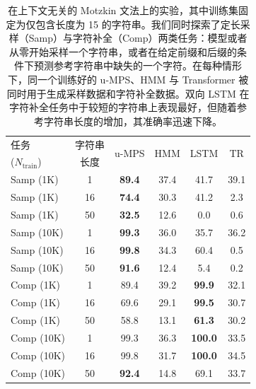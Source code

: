 \begin{table}[t]
\caption{在上下文无关的 Motzkin 文法上的实验，其中训练集固定为仅包含长度为 15 的字符串。我们同时探索了定长采样（Samp）与字符补全（Comp）两类任务：模型或者从零开始采样一个字符串，或者在给定前缀和后缀的条件下预测参考字符串中缺失的一个字符。在每种情形下，同一个训练好的 u-MPS、HMM 与 Transformer 被同时用于生成采样数据和字符补全数据。双向 LSTM 在字符补全任务中于较短的字符串上表现最好，但随着参考字符串长度的增加，其准确率迅速下降。}
\label{tab:motzkin}
\setlength\aboverulesep{0.1pt}
\setlength\belowrulesep{0.1pt}
\renewcommand{\arraystretch}{1.1}
\begin{center}
\begin{small}
\begin{sc}
\begin{tabular}{lc|cccc}
    任务 & 字符串 & \multirow{2}{*}{u-MPS} & \multirow{2}{*}{HMM} & \multirow{2}{*}{LSTM} & \multirow{2}{*}{TR} \\
    ($N_{\mathrm{train}}$) & 长度 &      &  &  &  \\
    \midrule
    Samp (1K)  & 1  & \textbf{89.4} & 37.4 & 41.7           & 39.1 \\
    Samp (1K)  & 16 & \textbf{74.4} & 30.3 & 41.2           & 2.3  \\
    Samp (1K)  & 50 & \textbf{32.5} & 12.6 & 0.0            & 0.6  \\
    Samp (10K) & 1  & \textbf{99.3} & 36.0 & 35.7           & 36.2 \\
    Samp (10K) & 16 & \textbf{99.8} & 34.3 & 60.4           & 0.5  \\
    Samp (10K) & 50 & \textbf{91.6} & 12.4 & 5.4            & 0.2  \\
    Comp (1K)  & 1  & 89.4          & 39.2 & \textbf{99.9}  & 32.1 \\
    Comp (1K)  & 16 & 69.6          & 29.1 & \textbf{99.5}  & 30.7 \\
    Comp (1K)  & 50 & 58.8          & 13.1 & \textbf{61.3}  & 30.2 \\
    Comp (10K) & 1  & 99.3          & 36.3 & \textbf{100.0} & 33.5 \\
    Comp (10K) & 16 & 99.8          & 31.7 & \textbf{100.0} & 34.5 \\
    Comp (10K) & 50 & \textbf{92.4} & 14.8 & 69.1           & 33.7 \\

\end{tabular}
\end{sc}
\end{small}
\end{center}
\vskip -0.1in
\end{table}
